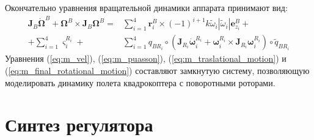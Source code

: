 Окончательно уравнения вращательной динамики аппарата принимают вид:
\begin{equation} \label{eq:m_final_rotational_motion}
\begin{aligned}
\bm{J}_B\dot{\bm{\Omega}}^B + \bm{\Omega}^B \times \bm{J}_B{\bm{\Omega}^B} =
&\sum_{i=1}^{4} {\bm{r}^B_i \times
	(-1)^{i+1} k \tilde \omega_i |\tilde \omega_i| \bm{e}^B_{z_i}} + \\ +
\sum_{i=1}^{4} {\bm{\varsigma}^{{R_i}}_{i}} +
&\sum_{i=1}^{4} q_{ B {R_i}} \circ (\bm{J}_{R_i}\dot{\bm{\omega}}^{R_i}_i + \bm{\omega}^{R_i}_i \times \bm{J}_{R_i}{\bm{\omega}^{R_i}_i}) \circ \tilde q_{ B {R_i}}
\end{aligned}
\end{equation}
Уравнения (\ref{eq:m_vel}), (\ref{eq:m_puasson}), (\ref{eq:m_traslational_motion}) и (\ref{eq:m_final_rotational_motion}) составляют замкнутую систему, позволяющую моделировать динамику полета квадрокоптера с поворотными роторами.

\section{Синтез регулятора}

